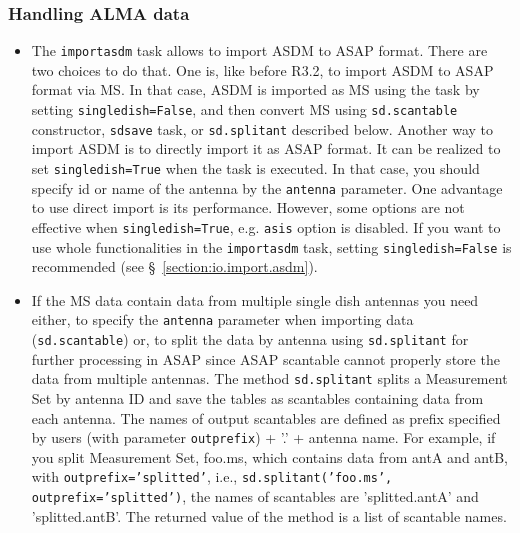 \subsubsection{Handling ALMA data}

\begin{itemize}
\item The {\tt importasdm} task allows to import ASDM to ASAP format. There 
are two choices to do that. One is, like before R3.2, to import ASDM to ASAP 
format via MS. In that case, ASDM is imported as MS using the task by 
setting {\tt singledish=False}, and then convert MS using {\tt sd.scantable} 
constructor, {\tt sdsave} task, or {\tt sd.splitant} described below. 
Another way to import ASDM is to directly import it as ASAP format. 
It can be realized to set {\tt singledish=True} when the 
task is executed. In that case, you should specify id or name of the
antenna by the {\tt antenna} parameter. 
One advantage to use direct import is its performance. However, some 
options are not effective when {\tt singledish=True}, e.g. {\tt asis} 
option is disabled. If you want to use whole functionalities in the 
{\tt importasdm} task, setting {\tt singledish=False} is recommended 
(see \S~\ref{section:io.import.asdm}).

\item If the MS data contain data from multiple single dish antennas you need either, to 
specify the {\tt antenna} parameter when importing data ({\tt sd.scantable}) or,
 to split the data by antenna using {\tt sd.splitant} for further processing in ASAP 
since ASAP scantable cannot properly store the data from multiple antennas.
The method {\tt sd.splitant} splits a Measurement Set by antenna ID
and save the tables as scantables containing data from each antenna. 
The names of output scantables are defined as prefix specified by
users (with parameter {\tt outprefix}) + '.' + antenna name. For
example, if you split Measurement Set, foo.ms, which contains data
from antA and antB, with {\tt outprefix='splitted'}, i.e., 
{\tt sd.splitant('foo.ms', outprefix='splitted')}, the names of scantables
are 'splitted.antA' and 'splitted.antB'.  
The returned value of the method is a list of scantable names. 


\end{itemize}
